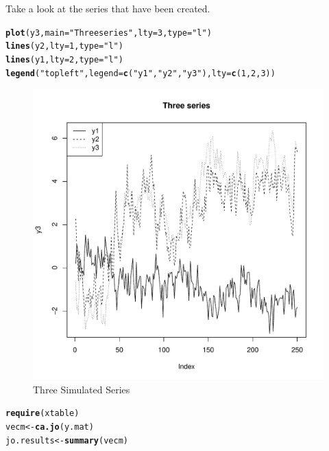 \documentclass{article}\usepackage{graphicx, color}
\makeatletter
\def\maxwidth{ %
  \ifdim\Gin@nat@width>\linewidth
    \linewidth
  \else
    \Gin@nat@width
  \fi
}
\newcommand{\hlfunctioncall}[1]{\textcolor[rgb]{0.501960784313725,0,0.329411764705882}{\textbf{#1}}}%
\newcommand{\hlstring}[1]{\textcolor[rgb]{0.6,0.6,1}{#1}}%
\newenvironment{kframe}{%
 \def\at@end@of@kframe{}%
 \ifinner\ifhmode%
  \def\at@end@of@kframe{\end{minipage}}%
  \begin{minipage}{\columnwidth}%
 \fi\fi%
 \def\FrameCommand##1{\hskip\@totalleftmargin \hskip-\fboxsep
 \colorbox{shadecolor}{##1}\hskip-\fboxsep
     \hskip-\linewidth \hskip-\@totalleftmargin \hskip\columnwidth}%
 \MakeFramed {\advance\hsize-\width
   \@totalleftmargin\z@ \linewidth\hsize
   \@setminipage}}%
 {\par\unskip\endMakeFramed%
 \at@end@of@kframe}
\newenvironment{knitrout}{}{} %
\makeatother
\begin{document}
Take a look at the series that have been created. 
\begin{knitrout}
\color{fgcolor}\begin{kframe}
\begin{alltt}
\hlfunctioncall{plot}(y3, main = \hlstring{"Three series"}, lty = 3, type = \hlstring{"l"})
\hlfunctioncall{lines}(y2, lty = 1, type = \hlstring{"l"})
\hlfunctioncall{lines}(y1, lty = 2, type = \hlstring{"l"})
\hlfunctioncall{legend}(\hlstring{"topleft"}, legend = \hlfunctioncall{c}(\hlstring{"y1"}, \hlstring{"y2"}, \hlstring{"y3"}), lty = \hlfunctioncall{c}(1, 2, 3))
\end{alltt}
\end{kframe}\begin{figure}[h]

\includegraphics[width=\maxwidth]{figure/plot3} \caption[Three Simulated Series]{Three Simulated Series\label{fig:plot3}}
\end{figure}


\end{knitrout}

\begin{knitrout}
\color{fgcolor}\begin{kframe}
\begin{alltt}
\hlfunctioncall{require}(xtable)
vecm <- \hlfunctioncall{ca.jo}(y.mat)
jo.results <- \hlfunctioncall{summary}(vecm)
\end{alltt}
\end{kframe}
\end{knitrout}
\end{document}
